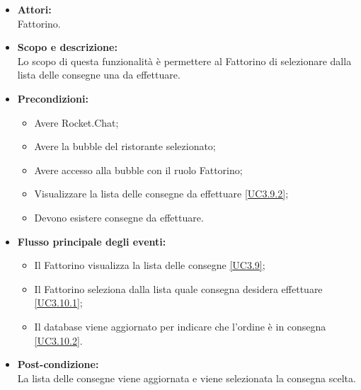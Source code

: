 \begin{itemize}
	\item \textbf{Attori:}
	\\Fattorino.
	\item \textbf{Scopo e descrizione:} 
	\\Lo scopo di questa funzionalità è permettere al Fattorino di selezionare dalla lista delle consegne una da effettuare.
	\item \textbf{Precondizioni:}
	\begin{itemize}
		\item Avere Rocket.Chat;
		\item Avere la bubble del ristorante selezionato;
		\item Avere accesso alla bubble con il ruolo Fattorino;
		\item Visualizzare la lista delle consegne da effettuare \ref{UC3.9.2};
		\item Devono esistere consegne da effettuare.
	\end{itemize}
	\item \textbf{Flusso principale degli eventi:}
	\begin{itemize}
		\item Il Fattorino visualizza la lista delle consegne \ref{UC3.9};
		\item Il Fattorino seleziona dalla lista quale consegna desidera effettuare \ref{UC3.10.1};
		\item Il database viene aggiornato per indicare che l'ordine è in consegna \ref{UC3.10.2}.
	\end{itemize}
	\item \textbf{Post-condizione:}
	\\La lista delle consegne viene aggiornata e viene selezionata la consegna scelta.
\end{itemize}


